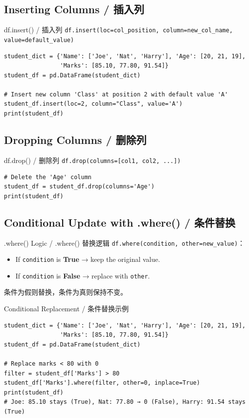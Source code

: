 \documentclass[11pt,a4paper]{report}
\let\oldtexttt\texttt
\renewcommand{\texttt}[1]{\textcolor{mainblue}{\oldtexttt{#1}}}
\begin{document}
\subsection{Inserting Columns / 插入列}

\begin{examplebox}{df.insert() / 插入列}
    \texttt{df.insert(loc=col\_position, column=new\_col\_name, value=default\_value)}
\begin{lstlisting}
student_dict = {'Name': ['Joe', 'Nat', 'Harry'], 'Age': [20, 21, 19],
                'Marks': [85.10, 77.80, 91.54]}
student_df = pd.DataFrame(student_dict)

# Insert new column 'Class' at position 2 with default value 'A'
student_df.insert(loc=2, column="Class", value='A')
print(student_df)
\end{lstlisting}
\end{examplebox}

\subsection{Dropping Columns / 删除列}

\begin{examplebox}{df.drop() / 删除列}
    \texttt{df.drop(columns=[col1, col2, ...])}
\begin{lstlisting}
# Delete the 'Age' column
student_df = student_df.drop(columns='Age')
print(student_df)
\end{lstlisting}
\end{examplebox}

\subsection{Conditional Update with .where() / 条件替换}

\begin{concept}{.where() Logic / .where() 替换逻辑}
    \texttt{df.where(condition, other=new\_value)}：
    \begin{itemize}[itemsep=0.3em]
        \item If \texttt{condition} is \textbf{True} → keep the original value.
        \item If \texttt{condition} is \textbf{False} → replace with \texttt{other}.
    \end{itemize}
    条件为假则替换，条件为真则保持不变。
\end{concept}

\begin{examplebox}{Conditional Replacement / 条件替换示例}
\begin{lstlisting}
student_dict = {'Name': ['Joe', 'Nat', 'Harry'], 'Age': [20, 21, 19],
                'Marks': [85.10, 77.80, 91.54]}
student_df = pd.DataFrame(student_dict)

# Replace marks < 80 with 0
filter = student_df['Marks'] > 80
student_df['Marks'].where(filter, other=0, inplace=True)
print(student_df)
# Joe: 85.10 stays (True), Nat: 77.80 → 0 (False), Harry: 91.54 stays (True)
\end{lstlisting}
\end{examplebox}
\end{document}
